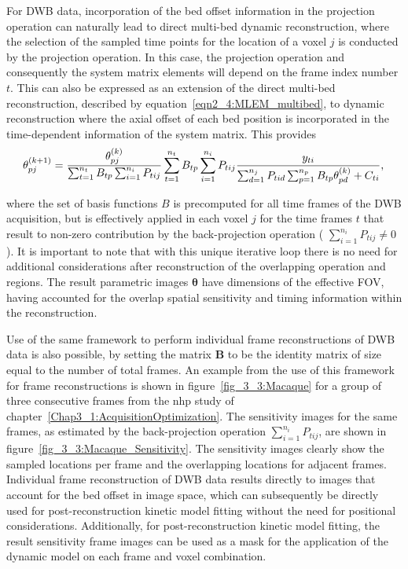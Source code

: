For DWB data, incorporation of the bed offset information in the projection operation can naturally lead to direct multi-bed dynamic reconstruction, where the selection of the sampled time points for the location of a voxel $j$ is conducted by the projection operation. In this case, the projection operation and consequently the system matrix elements will depend on the frame index number $t$. 
This can also be expressed as an extension of the direct multi-bed reconstruction, described by equation~\ref{eqn2_4:MLEM_multibed}, to dynamic reconstruction where the axial offset of each bed position is incorporated in the time-dependent information of the system matrix.
This provides
%
\begin{equation}
\theta_{pj}^{(k+1)} = \frac{\theta_{pj}^{(k)}}
{\sum_{t=1}^{n_t} B_{tp} \sum_{i=1}^{n_i} P_{tij}} 
\sum_{t=1}^{n_t} B_{tp}  \sum_{i=1}^{n_i} P_{tij} 
\frac{y_{ti}}
{\sum_{d=1}^{n_j} P_{tid} \sum_{p=1}^{n_p} B_{tp}\theta_{pd}^{(k)} + C_{ti} } \\, \\
\label{eqn:4DMLEM_Multibed}
\end{equation} 

where the set of basis functions $B$ is precomputed for all time frames of the DWB acquisition, but is effectively applied in each voxel $j$ for the time frames $t$ that result to non-zero contribution by the back-projection operation ( $\sum_{i=1}^{n_i} P_{tij} \neq 0$).
It is important to note that with this unique iterative loop there is no need for additional considerations after reconstruction of the overlapping operation and regions. The result parametric images $\boldsymbol\theta$ have dimensions of the effective FOV, having accounted for the overlap spatial sensitivity and timing information within the reconstruction.

Use of the same framework to perform individual frame reconstructions of DWB data is also possible, by setting the matrix $\boldsymbol{B}$ to be the identity matrix of size equal to the number of total frames. 
An example from the use of this framework for frame reconstructions is shown in figure~\ref{fig_3_3:Macaque} for a group of three consecutive frames from the \gls{nhp} study of chapter~\ref{Chap3_1:AcquisitionOptimization}. The sensitivity images for the same frames, as estimated by the back-projection operation $\sum_{i=1}^{n_i} P_{tij}$, are shown in figure~\ref{fig_3_3:Macaque_Sensitivity}.
The sensitivity images clearly show the sampled locations per frame and the overlapping locations for adjacent frames. 
Individual frame reconstruction of DWB data results directly to images that account for the bed offset in image space, which can subsequently be directly used for post-reconstruction kinetic model fitting without the need for positional considerations. 
Additionally, for post-reconstruction kinetic model fitting, the result sensitivity frame images can be used as a mask for the application of the dynamic model on each frame and voxel combination.

